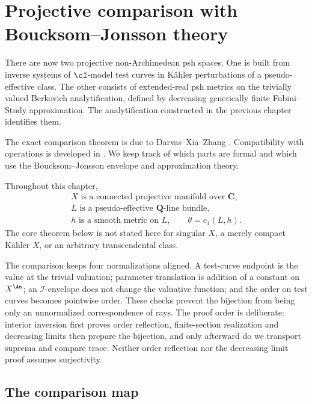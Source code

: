 \chapter{Projective comparison with Boucksom--Jonsson theory}
\label{chap:dxz-bj-comparison}

There are now two projective non-Archimedean psh spaces.
One is built from inverse systems of $\cI$-model test curves in K\"ahler
perturbations of a pseudo-effective class.
The other consists of extended-real psh metrics on the trivially valued
Berkovich analytification, defined by decreasing generically finite
Fubini--Study approximation.
The analytification constructed in the previous chapter identifies them.

The exact comparison theorem is due to Darvas--Xia--Zhang
\cite{DXZ23}.
Compatibility with operations is developed in
\cite{Xia23Operations}.
We keep track of which parts are formal and which use the
Boucksom--Jonsson envelope and approximation theory.

Throughout this chapter,
\[
\begin{gathered}
 X\text{ is a connected projective manifold over }\mathbf C,\\
 L\text{ is a pseudo-effective }\mathbf Q\text{-line bundle},\\
 h\text{ is a smooth metric on }L,\qquad \theta=c_1(L,h).
\end{gathered}
\tag{57.1}\label{eq:comp-scope}
\]
The core theorem below is not stated here for singular $X$, a merely
compact K\"ahler $X$, or an arbitrary transcendental class.

The comparison keeps four normalizations aligned.  A test-curve endpoint
is the value at the trivial valuation; parameter translation is addition
of a constant on $X^{\An}$; an $\mathcal I$-envelope does not change
the valuative function; and the order on test curves becomes pointwise
order.  These checks prevent the bijection from being only an unnormalized
correspondence of rays. The proof order is deliberate: interior inversion
first proves order reflection, finite-section realization and decreasing
limits then prepare the bijection, and only afterward do we transport
suprema and compare trace. Neither order reflection nor the decreasing
limit proof assumes surjectivity.

\section{The comparison map}
\label{sec:comp-map}


